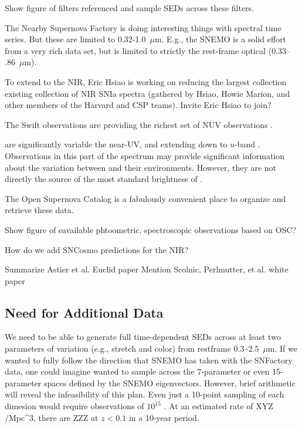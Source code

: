 {\tbd Show figure of filters referenced and sample \snia SEDs across these filters.}

The Nearby Supernova Factory is doing interesting things with spectral time series.  But these are limited to 0.32-1.0~$\mu$m.  
E.g., the SNEMO \citep{Saunders18} is a solid effort from a very rich data set, but is limited to strictly the rest-frame optical ($0.33$--$.86$~$\mu$m).

To extend to the NIR, Eric Hsiao is working on reducing the largest collection existing collection of NIR SNIa spectra (gathered by Hsiao, Howie Marion, and other members of the Harvard and CSP teams).
{\tbd Invite Eric Hsiao to join?}

The Swift \snia observations are providing the richest set of NUV observations \citep{Brown??}.

\sneia are significantly variable the near-UV, and extending down to $u$-band \citep[cf][]{Jha??, Brown}.  Observations in this part of the spectrum may provide significant information about the variation between \sneia and their environments.  However, they are not directly the source of the most standard brightness of \sneia.

The Open Supernova Catalog \citep{Guillochon17} is a fabulously convenient place to organize and retrieve these data.

{\tbd Show figure of eavailable phtoometric, spectroscopic observations based on OSC?}

{\tbd How do we add SNCosmo predictions for the NIR?}


{\tbd Summarize Astier et al. Euclid paper}
{\tbd Mention Scolnic, Perlmutter, et al. white paper}

\subsection{Need for Additional Data}

We need to be able to generate full time-dependent SEDs across at least two parameters of variation (e.g., stretch and color) from restframe 0.3--2.5~$\mu$m.  If we wanted to fully follow the direction that SNEMO has taken with the SNFactory data, one could imagine wanted to sample across the 7-parameter or even 15-parameter spaces defined by the SNEMO eigenvectors.  However, brief arithmetic will reveal the infeasibility of this plan.  Even just a 10-point sampling of each dimesion would require observations of $10^{15}$ \sneia.  At an estimated rate of XYZ \snia/Mpc^{3}, there are ZZZ \sneia at $z<0.1$ in a 10-year period.

